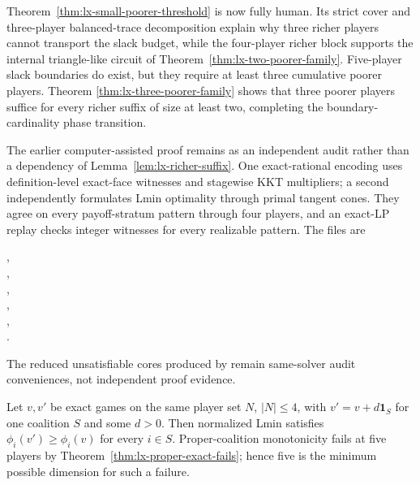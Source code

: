 Theorem~\ref{thm:lx-small-poorer-threshold} is now fully human.  Its strict
cover and three-player balanced-trace decomposition explain why three richer
players cannot transport the slack budget, while the four-player richer block
supports the internal triangle-like circuit of
Theorem~\ref{thm:lx-two-poorer-family}.  Five-player slack boundaries do
exist, but they require at least three cumulative poorer players.  Theorem
\ref{thm:lx-three-poorer-family} shows that three poorer players suffice for
every richer suffix of size at least two, completing the boundary-cardinality
phase transition.

The earlier computer-assisted proof remains as an independent audit rather
than a dependency of Lemma~\ref{lem:lx-richer-suffix}.  One exact-rational
encoding uses definition-level exact-face witnesses and stagewise KKT
multipliers; a second independently formulates Lmin optimality through primal
tangent cones.  They agree on every payoff-stratum pattern through four
players, and an exact-LP replay checks integer witnesses for every realizable
pattern.  The files are
\begin{center}
\small{},\\[-2pt]
\small{},\\[-2pt]
\small{},\\[-2pt]
\small{},\\[-2pt]
\small{},\\[-2pt]
\small{}.
\end{center}
The reduced unsatisfiable cores produced by
 remain same-solver audit
conveniences, not independent proof evidence.

\begin{theorem}
\label{thm:lx-proper-minimum-dimension}
Let $v,v'$ be exact games on the same player set $N$, $|N|\leq4$, with
$v'=v+d\mathbf1_S$ for one coalition $S$ and some $d>0$.  Then normalized
Lmin satisfies $\phi_i(v')\geq\phi_i(v)$ for every $i\in S$.
Proper-coalition monotonicity fails at five players by
Theorem~\ref{thm:lx-proper-exact-fails}; hence five is the minimum possible
dimension for such a failure.
\end{theorem}


